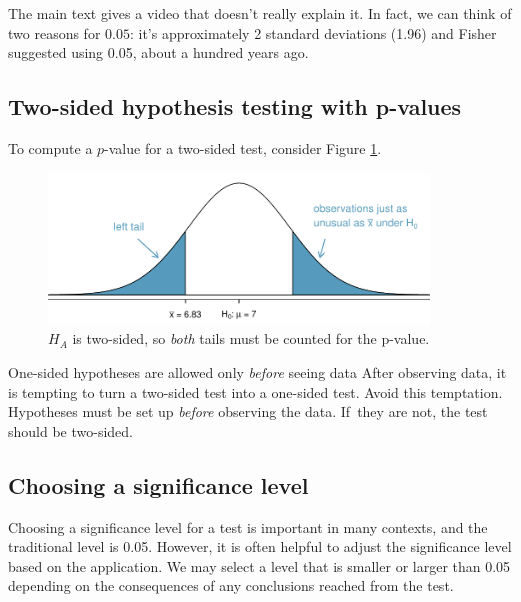 \begin{termBox}{
The main text gives a video that doesn't really explain it. In fact, we can think of two reasons for $0.05$: it's approximately 2 standard deviations (1.96) and Fisher suggested using 0.05, about a hundred years ago.}
\end{termBox}


\subsection{Two-sided hypothesis testing with p-values}
\label{twoSidedTestsWithPValues}


To compute a $p$-value for a two-sided test, consider Figure \ref{2ndSchSleepHTExample}.
\begin{figure}
   \centering
   \includegraphics[width=0.9\textwidth]{ch_inference_foundations/figures/2ndSchSleepHTExample/2ndSchSleepHTExample}
   \caption{$H_A$ is two-sided, so \emph{both} tails must be counted for the p-value.}
   \label{2ndSchSleepHTExample}
\end{figure}



\begin{caution}{One-sided hypotheses are allowed only \emph{before} seeing data}
{After observing data, it is tempting to turn a two-sided test into a one-sided test. Avoid this temptation. Hypotheses must be set up \emph{before} observing the data. If~they are not, the test should be two-sided.}
\end{caution}


\subsection{Choosing a significance level}
\label{significanceLevel}


Choosing a significance level for a test is important in many contexts, and the traditional level is 0.05. However, it is often helpful to adjust the significance level based on the application. We may select a level that is smaller or larger than 0.05 depending on the consequences of any conclusions reached from the test.

